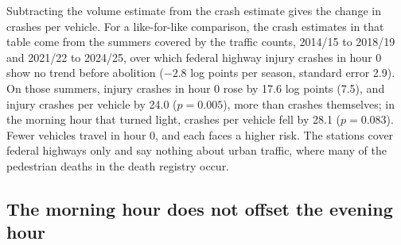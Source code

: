 Subtracting the volume estimate from the crash estimate gives the change in crashes per vehicle. For a like-for-like comparison, the crash estimates in that table come from the summers covered by the traffic counts, 2014/15 to 2018/19 and 2021/22 to 2024/25, over which federal highway injury crashes in hour 0 show no trend before abolition ($-2.8$ log points per season, standard error 2.9). %
On those summers, injury crashes in hour 0 rose by 17.6 log points (7.5), and injury crashes per vehicle by 24.0 ($p=0.005$), more than crashes themselves; in the morning hour that turned light, crashes per vehicle fell by 28.1 ($p=0.083$). Fewer vehicles travel in hour 0, and each faces a higher risk. The stations cover federal highways only and say nothing about urban traffic, where many of the pedestrian deaths in the death registry occur.

\subsection{The morning hour does not offset the evening hour}\label{sec:offset}

